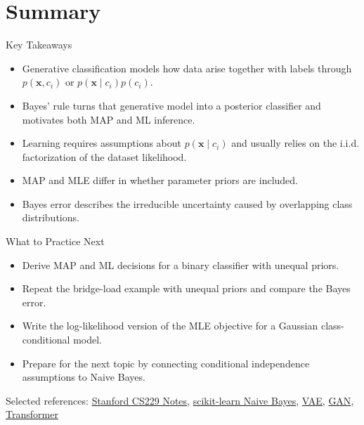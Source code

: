\documentclass[10pt]{beamer}
\begin{document}
\section{Summary}

\begin{frame}{Key Takeaways}
  \justifying
  \begin{itemize}
    \item Generative classification models how data arise together with labels through $p(\bm{x},c_i)$ or $p(\bm{x}\mid c_i)p(c_i)$.
    \item Bayes' rule turns that generative model into a posterior classifier and motivates both MAP and ML inference.
    \item Learning requires assumptions about $p(\bm{x}\mid c_i)$ and usually relies on the i.i.d. factorization of the dataset likelihood.
    \item MAP and MLE differ in whether parameter priors are included.
    \item Bayes error describes the irreducible uncertainty caused by overlapping class distributions.
  \end{itemize}
\end{frame}

\begin{frame}{What to Practice Next}
  \justifying
  \begin{itemize}
    \item Derive MAP and ML decisions for a binary classifier with unequal priors.
    \item Repeat the bridge-load example with unequal priors and compare the Bayes error.
    \item Write the log-likelihood version of the MLE objective for a Gaussian class-conditional model.
    \item Prepare for the next topic by connecting conditional independence assumptions to Naive Bayes.
  \end{itemize}
  \vspace{0.4em}
  {\footnotesize Selected references: \href{https://cs229.stanford.edu/notes2020fall/cs229-notes2.pdf}{Stanford CS229 Notes}, \href{https://scikit-learn.org/stable/modules/naive_bayes.html}{scikit-learn Naive Bayes}, \href{https://arxiv.org/abs/1312.6114}{VAE}, \href{https://arxiv.org/abs/1406.2661}{GAN}, \href{https://arxiv.org/abs/1706.03762}{Transformer}}
\end{frame}
\end{document}
